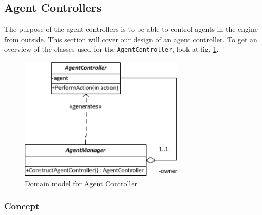 
\subsection{Agent Controllers}

The purpose of the agent controllers is to be able to control agents
in the engine from outside. This section will cover our design of
an agent controller. To get an overview of the classes used for the
\texttt{AgentController}, look at fig. \ref{fig:AgentControllerDomainModel}.

\begin{figure}
\begin{centering}
\includegraphics[width=0.7\textwidth]{AgentControllerDomainUML}
\par\end{centering}

\caption{Domain model for Agent Controller\label{fig:AgentControllerDomainModel}}
\end{figure}



\subsubsection{Concept}

